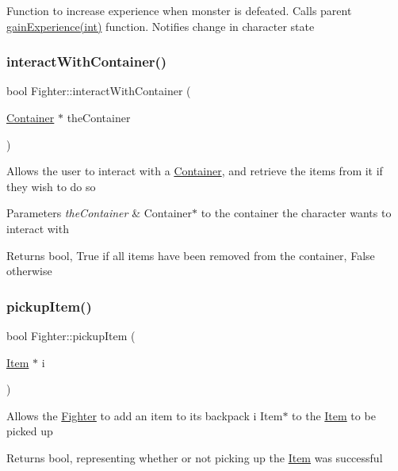 Function to increase experience when monster is defeated. Calls parent \hyperlink{class_fighter_af411947929c37ef0a0eab87b0c45f4f3}{gain\+Experience(int)} function. Notifies change in character state \hypertarget{class_fighter_a66c0adfa4979fa3ac994359a188121a8}{}\label{class_fighter_a66c0adfa4979fa3ac994359a188121a8} 
\subsubsection{\texorpdfstring{interact\+With\+Container()}{interactWithContainer()}}
{\footnotesize\ttfamily bool Fighter\+::interact\+With\+Container (\begin{DoxyParamCaption}\item[{\hyperlink{class_container}{Container} $\ast$}]{the\+Container }\end{DoxyParamCaption})}

Allows the user to interact with a \hyperlink{class_container}{Container}, and retrieve the items from it if they wish to do so 
\begin{DoxyParams}{Parameters}
{\em the\+Container} & Container$\ast$ to the container the character wants to interact with \\
\hline
\end{DoxyParams}
\begin{DoxyReturn}{Returns}
bool, True if all items have been removed from the container, False otherwise 
\end{DoxyReturn}
\hypertarget{class_fighter_a69dccfbc61abf5720e8a329203158d1e}{}\label{class_fighter_a69dccfbc61abf5720e8a329203158d1e} 
\subsubsection{\texorpdfstring{pickup\+Item()}{pickupItem()}}
{\footnotesize\ttfamily bool Fighter\+::pickup\+Item (\begin{DoxyParamCaption}\item[{\hyperlink{class_item}{Item} $\ast$}]{i }\end{DoxyParamCaption})}

Allows the \hyperlink{class_fighter}{Fighter} to add an item to its backpack  i Item$\ast$ to the \hyperlink{class_item}{Item} to be picked up \begin{DoxyReturn}{Returns}
bool, representing whether or not picking up the \hyperlink{class_item}{Item} was successful 
\end{DoxyReturn}
\hypertarget{class_fighter_afe019dbd9ed0f0d10e047127dc478a63}{}\label{class_fighter_afe019dbd9ed0f0d10e047127dc478a63} 
